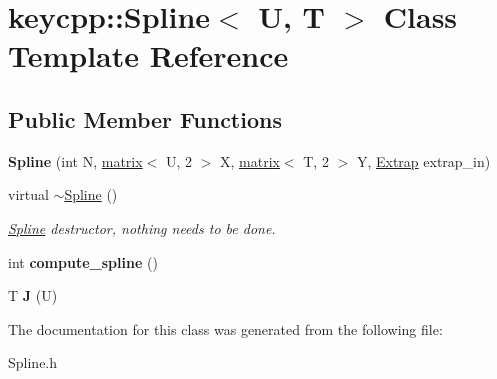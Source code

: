 \hypertarget{classkeycpp_1_1_spline}{\section{keycpp\-:\-:Spline$<$ U, T $>$ Class Template Reference}
\label{classkeycpp_1_1_spline}
}
\subsection*{Public Member Functions}
\begin{DoxyCompactItemize}
\item 
\hypertarget{classkeycpp_1_1_spline_ae19cc5856f7eacf9638a07b22d2e1712}{{\bfseries Spline} (int N, \hyperlink{classkeycpp_1_1matrix}{matrix}$<$ U, 2 $>$ X, \hyperlink{classkeycpp_1_1matrix}{matrix}$<$ T, 2 $>$ Y, \hyperlink{classkeycpp_1_1_extrap}{Extrap} extrap\-\_\-in)}\label{classkeycpp_1_1_spline_ae19cc5856f7eacf9638a07b22d2e1712}

\item 
\hypertarget{classkeycpp_1_1_spline_a8d7aaf51fd3a1c48ed43d70b2b9c10fe}{virtual \hyperlink{classkeycpp_1_1_spline_a8d7aaf51fd3a1c48ed43d70b2b9c10fe}{$\sim$\-Spline} ()}\label{classkeycpp_1_1_spline_a8d7aaf51fd3a1c48ed43d70b2b9c10fe}

\begin{DoxyCompactList}\small\item\em \hyperlink{classkeycpp_1_1_spline}{Spline} destructor, nothing needs to be done. \end{DoxyCompactList}\item 
\hypertarget{classkeycpp_1_1_spline_afcd84822df41426f4ea9da070d97b376}{int {\bfseries compute\-\_\-spline} ()}\label{classkeycpp_1_1_spline_afcd84822df41426f4ea9da070d97b376}

\item 
\hypertarget{classkeycpp_1_1_spline_a7fa452b0c1952f0a3e4160f59195d513}{T {\bfseries J} (U)}\label{classkeycpp_1_1_spline_a7fa452b0c1952f0a3e4160f59195d513}

\end{DoxyCompactItemize}


The documentation for this class was generated from the following file\-:\begin{DoxyCompactItemize}
\item 
Spline.\-h\end{DoxyCompactItemize}
